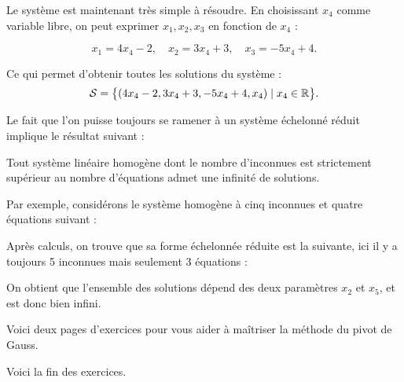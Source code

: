 Le système est maintenant très simple à résoudre. En choisissant $x_4$ comme variable libre, on peut exprimer
$x_1,x_2,x_3$ en fonction de $x_4$ :

\change

$$x_1=4x_4-2, \quad x_2 = 3x_4+3,\quad x_3=-5x_4+4.$$


\change

Ce qui permet d'obtenir toutes les solutions du système :
$$\mathcal{S}= \big\lbrace (4x_4-2,3x_4+3,-5x_4+4,x_4) \mid x_4 \in \mathbb{R} \big\rbrace.$$

\diapo

Le fait que l'on puisse toujours se ramener à un système échelonné 
réduit implique le résultat suivant :

Tout système linéaire homogène dont le nombre d'inconnues est strictement 
supérieur au nombre d'équations admet une infinité de solutions. 


\change


Par exemple, considérons le système homogène à cinq inconnues et quatre équations suivant :

\change


Après calculs, on trouve que sa forme échelonnée réduite est la suivante, ici il y a toujours 
5 inconnues mais seulement 3 équations :

\change

On obtient que l'ensemble des solutions dépend des deux paramètres \(x_2\) et  \(x_5\), et est donc bien infini. 




\diapo


Voici deux pages d'exercices pour vous aider à maîtriser la méthode du pivot de Gauss.

\diapo

Voici la fin des exercices.


